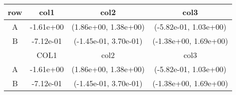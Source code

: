 \begin{tabular}{cccc}
\toprule
row&col1&col2&col3\tabularnewline
\midrule
A&-1.61e+00& (1.86e+00, 1.38e+00)& (-5.82e-01, 1.03e+00)\tabularnewline
B&-7.12e-01& (-1.45e-01, 3.70e-01)& (-1.38e+00, 1.69e+00)\tabularnewline
\midrule
&COL1&col2&col3\tabularnewline
\midrule
A&-1.61e+00& (1.86e+00, 1.38e+00)& (-5.82e-01, 1.03e+00)\tabularnewline
B&-7.12e-01& (-1.45e-01, 3.70e-01)& (-1.38e+00, 1.69e+00)\tabularnewline
\bottomrule
\end{tabular}

